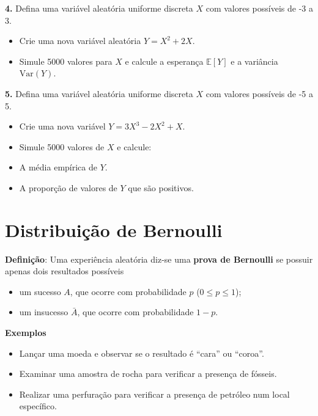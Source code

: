 \documentclass[
]{book}
\providecommand{\tightlist}{%
  \setlength{\itemsep}{0pt}\setlength{\parskip}{0pt}}
\begin{document}
\textbf{4.} Defina uma variável aleatória uniforme discreta \(X\) com valores possíveis de -3 a 3.

\begin{itemize}
\tightlist
\item
  Crie uma nova variável aleatória \(Y = X^2 + 2X\).
\item
  Simule 5000 valores para \(X\) e calcule a esperança \(\mathbb{E}[Y]\) e a variância \(\text{Var}(Y)\).
\end{itemize}

\textbf{5.} Defina uma variável aleatória uniforme discreta \(X\) com valores possíveis de -5 a 5.

\begin{itemize}
\tightlist
\item
  Crie uma nova variável \(Y = 3X^3 - 2X^2 + X\).
\item
  Simule 5000 valores de \(X\) e calcule:
\item
  A média empírica de \(Y\).
\item
  A proporção de valores de \(Y\) que são positivos.
\end{itemize}

\section{Distribuição de Bernoulli}\label{distribuiuxe7uxe3o-de-bernoulli}

\textbf{Definição}: Uma experiência aleatória diz-se uma \textbf{prova de Bernoulli} se possuir apenas dois resultados possíveis

\begin{itemize}
\item
  um sucesso \(A\), que ocorre com probabilidade \(p\) (\(0\leq p \leq 1\));
\item
  um insucesso \(\bar{A}\), que ocorre com probabilidade \(1-p\).
\end{itemize}

\textbf{Exemplos}

\begin{itemize}
\tightlist
\item
  Lançar uma moeda e observar se o resultado é ``cara'' ou ``coroa''.
\item
  Examinar uma amostra de rocha para verificar a presença de fósseis.
\item
  Realizar uma perfuração para verificar a presença de petróleo num local específico.
\end{itemize}
\end{document}
